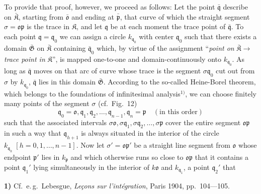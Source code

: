 \documentclass{article}
\begin{document}
To provide that proof, however, we proceed as follows: Let the point $\bar{\mathfrak{q}}$ describe on $\bar{\mathfrak{K}}$, starting from $\bar{\mathfrak{o}}$ and ending at $\bar{\mathfrak{p}}$, that curve of which the straight segment $\sigma = \mathfrak{o}\mathfrak{p}$ is the trace in $\mathfrak{K}$, and let $\mathfrak{q}$ be at each moment the trace point of $\bar{\mathfrak{q}}$. To each point $\mathfrak{q} = \mathfrak{q}_0$ we can assign a circle $k_{\mathfrak{q}_0}$ with center $\mathfrak{q}_0$ such that there exists a domain $\bar{\mathfrak{G}}$ on $\bar{\mathfrak{K}}$ containing $\bar{\mathfrak{q}}_0$ which, by virtue of the assignment ``\emph{point on} $\bar{\mathfrak{K}} \to$ \emph{trace point in} $\mathfrak{K}$'', is mapped one-to-one and domain-continuously onto $k_{\mathfrak{q}_0}$. As long as $\bar{\mathfrak{q}}$ moves on that arc of curve whose trace is the segment $\sigma\mathfrak{q}_0$ cut out from $\sigma$ by $k_{\mathfrak{q}_0}$, $\bar{\mathfrak{q}}$ lies in this domain $\bar{\mathfrak{G}}$. According to the so-called Heine-Borel theorem, which belongs to the foundations of infinitesimal analysis${}^{1)}$, we can choose finitely many points of the segment $\sigma$ (cf.\ Fig.~12)
\[ \mathfrak{q}_0 = \mathfrak{o}, \mathfrak{q}_1, \mathfrak{q}_2, \dots, \mathfrak{q}_{n-1}, \mathfrak{q}_n = \mathfrak{p} \quad (\text{in this order}) \]
such that the associated intervals $\sigma\mathfrak{o}, \sigma\mathfrak{q}_1, \sigma\mathfrak{q}_2, \dots, \sigma\mathfrak{p}$ cover the entire segment $\mathfrak{o}\mathfrak{p}$ in such a way that $\mathfrak{q}_{h+1}$ is always situated in the interior of the circle $k_{\mathfrak{q}_h}\;[h = 0, 1, \dots, n-1]$. Now let $\sigma' = \mathfrak{o}\mathfrak{p}'$ be a straight line segment from $\mathfrak{o}$ whose endpoint $\mathfrak{p}'$ lies in $k_{\mathfrak{p}}$ and which otherwise runs so close to $\mathfrak{o}\mathfrak{p}$ that it contains a point $\mathfrak{q}_1'$ lying simultaneously in the interior of $k\mathfrak{o}$ and $k_{\mathfrak{q}_1}$, a point $\mathfrak{q}_2'$ that


\textbf{1)} Cf.\ e.\,g.\ Lebesgue, \emph{Leçons sur l'intégration}, Paris 1904, pp.\ 104---105.
\end{document}
